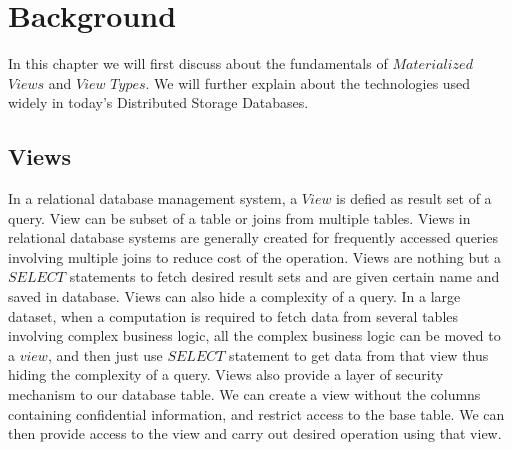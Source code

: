 \documentclass[11pt,a4paper,bibtotoc,idxtotoc,headsepline,footsepline,footexclude,BCOR12mm,DIV13]{scrbook}
\begin{document}


\chapter{Background}
\label{chap:background}

In this chapter we will first discuss about the fundamentals of $Materialized$ $Views$ and $View$ $Types$. We will further explain about the technologies used widely in today's Distributed Storage Databases. 

\section{Views}
In a relational database management system, a $View$ is defied as result set of a query. View can be subset of a table or joins from multiple tables. Views in relational database systems are generally created for frequently accessed queries involving multiple joins to reduce cost of the operation. Views are nothing but a $SELECT$ statements to fetch desired result sets and are given certain name and saved in database. Views can also hide a complexity of a query. In a large dataset, when a computation is required to fetch data from several tables involving complex business logic, all the complex business logic can be moved to a $view$, and then just use $SELECT$ statement to get data from that view thus hiding the complexity of a query. Views also provide a layer of security mechanism to our database table. We can create a view without the columns containing confidential information, and restrict access to the base table. We can then provide access to the view and carry out desired operation using that view. 
\end{document}

